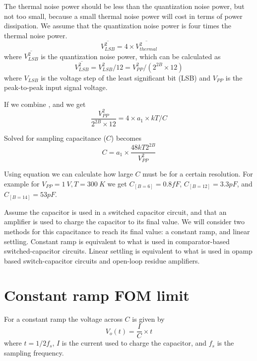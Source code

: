  The thermal noise power should be less
than the quantization noise power, but not too small, because a 
small thermal noise power will cost in terms of power dissipation. 
We assume that the quantization noise power is four times the thermal noise power.
\begin{equation}
  \label{eq:lsbvsthermal}
  \overline{V_{LSB}^2} = 4\times\overline{V_{thermal}^2}
\end{equation}
where $\overline{V_{LSB}^2}$ is the quantization noise power, which can
be calculated as
\begin{equation}
\label{eq:lsb}
\overline{V_{LSB}^2} = V_{LSB}^2/12= V_{PP}^2/(2^{2B}\times
  12)
\end{equation}
where $V_{LSB}$ is the voltage step of the least significant bit (LSB)
and  $V_{PP}$ is the peak-to-peak
input signal voltage.

If we combine ,  and  we get
\begin{equation} 
  \label{eq:cap1}
 \dfrac{ V_{PP}^2}{2^{2B}\times12} = 4 \times a_1 \times kT/C
\end{equation}

Solved for sampling capacitance ($C$)  becomes
\begin{equation}
\label{eq:cap}
C = a_1 \times \dfrac{48 k T 2^{2B}}{V_{PP}^2}  
\end{equation}

Using equation  we can calculate how large $C$ must be for a certain  resolution. For example
for $V_{PP} = 1\:V, T = 300\:K$ we get $C_{[B=6]} = 0.8fF$, $ C_{[B=12]}  =
3.3pF$, and $C_{[B=14]} = 53pF$. 

Assume the capacitor is used in a switched capacitor circuit, and that
 an amplifier is used to charge the capacitor to its final value.
We will consider two methods for this capacitance to reach its final
value: a constant ramp, and linear settling. Constant ramp is 
equivalent to what is used in comparator-based switched-capacitor
circuits. Linear settling is equivalent to what is used
in opamp based switch-capacitor circuits and open-loop residue
amplifiers. 

\section{Constant ramp FOM limit}
For a constant ramp the voltage across $C$ is given by
\begin{equation}
\label{eq:const1}
V_o(t) = \dfrac{I}{C}\times t 
\end{equation}
where $t = 1/2f_s$, $I$ is the current used to charge the capacitor,
and $f_s$ is the sampling frequency.

